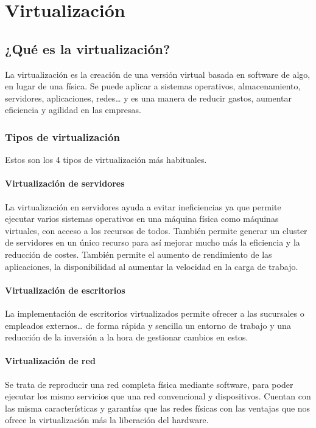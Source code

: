 \chapter{Virtualización}

\section{¿Qué es la virtualización?}

La virtualización es la creación de una versión virtual basada en software de algo, en lugar de una física. Se puede aplicar a sistemas operativos, almacenamiento, servidores, aplicaciones, redes… y es una manera de reducir gastos, aumentar eficiencia y agilidad en las empresas.  

\subsection{Tipos de virtualización}

Estos son los 4 tipos de virtualización más habituales.
\subsubsection{Virtualización de servidores}

La virtualización en servidores ayuda a evitar ineficiencias ya que permite ejecutar varios sistemas operativos en una máquina física como máquinas virtuales, con acceso a los recursos de todos. 
También permite generar un cluster de servidores en un único recurso para así mejorar mucho más la eficiencia y la reducción de costes. También permite el aumento de rendimiento de las aplicaciones, la disponibilidad al aumentar la velocidad en la carga de trabajo.

\subsubsection{Virtualización de escritorios}

La implementación de escritorios virtualizados permite ofrecer a las sucursales o empleados externos… de forma rápida y sencilla un entorno de trabajo y una reducción de la inversión a la hora de gestionar cambios en estos. 

\subsubsection{Virtualización de red}

Se trata de reproducir una red completa física mediante software, para poder ejecutar los mismo servicios que una red convencional y dispositivos. Cuentan con las misma características y garantías que las redes físicas con las ventajas que nos ofrece la virtualización más la liberación del hardware.

